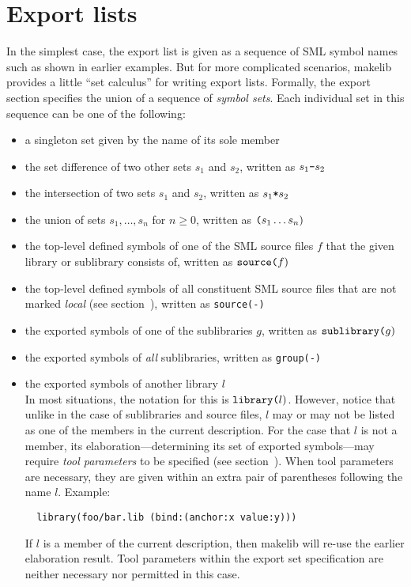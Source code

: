 
\section{Export lists}
\label{sec:exportcalculus}

In the simplest case, the export list is given as a sequence of SML
symbol names such as shown in earlier examples.  But for more
complicated scenarios, makelib provides a little ``set calculus'' for
writing export lists.  Formally, the export section specifies the
union of a sequence of {\em symbol sets}.  Each individual set in this
sequence can be one of the following:

\begin{itemize}\setlength{\itemsep}{0pt}
\item a singleton set given by the name of its sole member
\item the set difference of two other sets $s_1$ and $s_2$, written as $s_1
\mbox{\tt -} s_2$
\item the intersection of two sets $s_1$ and $s_2$, written as $s_1
\mbox{\tt *} s_2$
\item the union of sets $s_1, \ldots, s_n$ for $n \ge 0$, written as
$\mbox{\tt (} s_1 \ldots s_n \mbox{)}$
\item the top-level defined symbols of one of the SML source files $f$
that the given library or sublibrary consists of, written as
$\mbox{\tt source(}f\mbox{)}$
\item the top-level defined symbols of all constituent SML source
files that are not marked {\em local} (see section~),
written as {\tt source(-)}
\item the exported symbols of one of the sublibraries $g$, written as
$\mbox{\tt sublibrary(}g\mbox{)}$
\item the exported symbols of {\em all} sublibraries, written as
{\tt group(-)}
\item the exported symbols of another library $l$ \\
In most situations, the notation for this is $\mbox{\tt library(}l\mbox{)}$.
However, notice that unlike in the case of sublibraries and source
files, $l$ may or may not be listed as one of the members in the
current description.  For the case that $l$ is not a member, its
elaboration---determining its set of exported symbols---may require
{\em tool parameters} to be specified (see
section~).  When tool parameters are necessary,
they are given within an extra pair of parentheses following the name
$l$.  Example:
\begin{verbatim}
  library(foo/bar.lib (bind:(anchor:x value:y)))
\end{verbatim}
\noindent If $l$ is a member of the current description, then makelib will
re-use the earlier elaboration result.  Tool parameters within the
export set specification are neither necessary nor permitted in this case.
\end{itemize}


